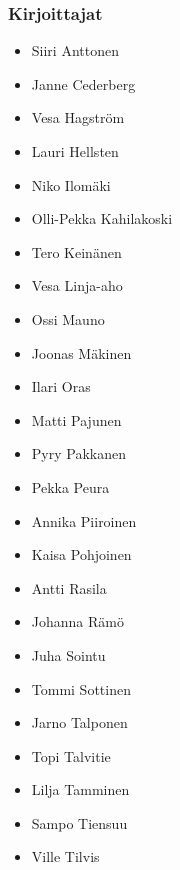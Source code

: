 \subsubsection*{Kirjoittajat}
\begin{itemize}
\item Siiri Anttonen
\item Janne Cederberg
\item Vesa Hagström
\item Lauri Hellsten
\item Niko Ilomäki
\item Olli-Pekka Kahilakoski
\item Tero Keinänen
\item Vesa Linja-aho
\item Ossi Mauno
\item Joonas Mäkinen
\item Ilari Oras
\item Matti Pajunen
\item Pyry Pakkanen
\item Pekka Peura
\item Annika Piiroinen
\item Kaisa Pohjoinen
\item Antti Rasila
\item Johanna Rämö
\item Juha Sointu
\item Tommi Sottinen
\item Jarno Talponen
\item Topi Talvitie
\item Lilja Tamminen
\item Sampo Tiensuu
\item Ville Tilvis
\end{itemize}

